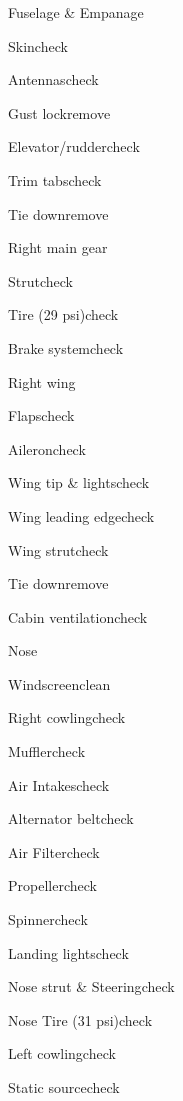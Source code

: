 \begin{multicols}{2}
\begin{checklist}{Fuselage \& Empanage}
  \item{Skin}{check}
  \item{Antennas}{check}
  \item{Gust lock}{remove}
  \item{Elevator/rudder}{check}
  \item{Trim tabs}{check}
  \item{Tie down}{remove}
\end{checklist}

\begin{checklist}{Right main gear}
  \item{Strut}{check}
  \item{Tire (29 psi)}{check}
  \item{Brake system}{check}
\end{checklist}

\begin{checklist}{Right wing}
  \item{Flaps}{check}
  \item{Aileron}{check}
  \item{Wing tip \& lights}{check}
  \item{Wing leading edge}{check}
  \item{Wing strut}{check}
  \item{Tie down}{remove}
  \item{Cabin ventilation}{check}
\end{checklist}

\begin{checklist}{Nose}
  \item{Windscreen}{clean}
  \item{Right cowling}{check}
  \item{Muffler}{check}
  \item{Air Intakes}{check}
  \item{Alternator belt}{check}
  \item{Air Filter}{check}
  \item{Propeller}{check}
  \item{Spinner}{check}
  \item{Landing lights}{check}
  \item{Nose strut \& Steering}{check}
  \item{Nose Tire (31 psi)}{check}
  \item{Left cowling}{check}
  \item{Static source}{check}
\end{checklist}
\end{multicols}
